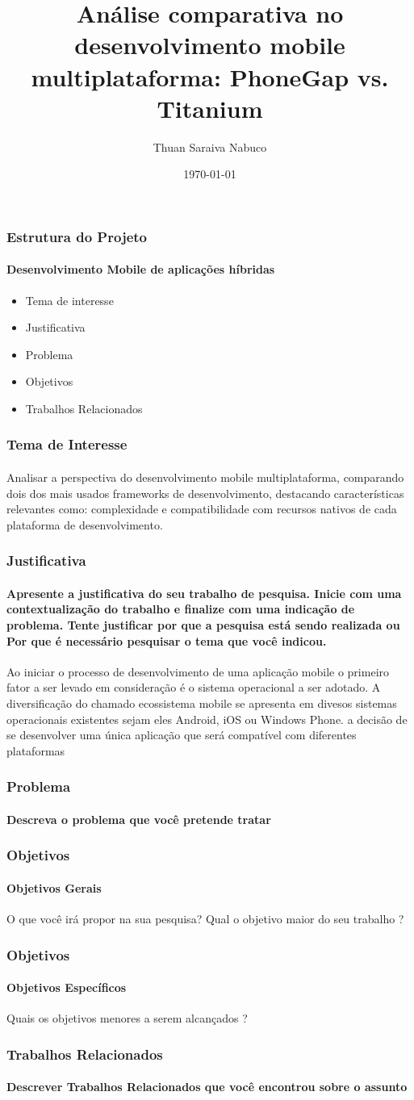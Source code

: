\documentclass{beamer}
\title{Análise comparativa no desenvolvimento mobile multiplataforma: PhoneGap vs. Titanium}
\author{Thuan Saraiva Nabuco}
\institute{Universidade Estadual do Ceará}
\date{\today}
\begin{document}
\titlepage
\begin{frame}
	\frametitle{Estrutura do Projeto}
	\framesubtitle{Desenvolvimento Mobile de aplicações híbridas}
	\begin{itemize}
		\item Tema de interesse
		\item Justificativa
		\item Problema
		\item Objetivos
		\item Trabalhos Relacionados
	\end{itemize}
\end{frame}

\begin{frame}
	\frametitle{Tema de Interesse}
	\framesubtitle{}
	Analisar a perspectiva do desenvolvimento mobile multiplataforma, comparando dois dos mais usados frameworks de desenvolvimento, destacando características relevantes como: complexidade e compatibilidade com recursos nativos de cada plataforma de desenvolvimento.
\end{frame}

\begin{frame}
	\frametitle{Justificativa}
	\framesubtitle{Apresente a justificativa do seu trabalho de pesquisa. Inicie com uma contextualização do trabalho e finalize com uma indicação de problema. Tente justificar por que a pesquisa está sendo realizada ou Por que é necessário pesquisar o tema que você indicou.}
	Ao iniciar o processo de desenvolvimento de uma aplicação mobile o primeiro fator a ser levado em consideração é o sistema operacional a ser adotado. A diversificação do chamado ecossistema mobile se apresenta em divesos sistemas operacionais existentes sejam eles Android, iOS ou Windows Phone. a decisão de se desenvolver uma única aplicação que será compatível com diferentes plataformas
\end{frame}

\begin{frame}
	\frametitle{Problema}
	\framesubtitle{Descreva o problema que você pretende tratar}
	
\end{frame}

\begin{frame}
	\frametitle{Objetivos}
	\framesubtitle{Objetivos Gerais}
	O que você irá propor na sua pesquisa? Qual o objetivo maior do seu trabalho ?
\end{frame}

\begin{frame}
	\frametitle{Objetivos}
	\framesubtitle{Objetivos Específicos}
	Quais os objetivos menores a serem alcançados ?
\end{frame}

\begin{frame}
	\frametitle{Trabalhos Relacionados}
	\framesubtitle{Descrever Trabalhos Relacionados que você encontrou sobre o assunto}
	
\end{frame}
\end{document}
